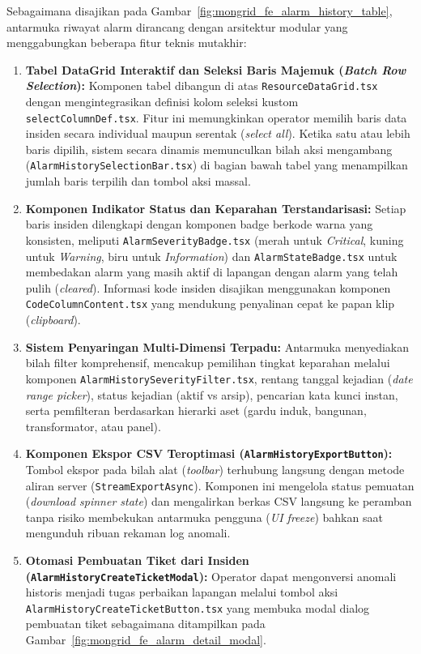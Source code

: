 Sebagaimana disajikan pada Gambar~\ref{fig:mongrid_fe_alarm_history_table}, antarmuka riwayat alarm dirancang dengan arsitektur modular yang menggabungkan beberapa fitur teknis mutakhir:
\begin{enumerate}[label=\arabic*., leftmargin=*, itemsep=0pt]
  \item \textbf{Tabel DataGrid Interaktif dan Seleksi Baris Majemuk (\textit{Batch Row Selection}):} Komponen tabel dibangun di atas \texttt{ResourceDataGrid.tsx} dengan mengintegrasikan definisi kolom seleksi kustom \texttt{selectColumnDef.tsx}. Fitur ini memungkinkan operator memilih baris data insiden secara individual maupun serentak (\textit{select all}). Ketika satu atau lebih baris dipilih, sistem secara dinamis memunculkan bilah aksi mengambang (\texttt{AlarmHistorySelectionBar.tsx}) di bagian bawah tabel yang menampilkan jumlah baris terpilih dan tombol aksi massal.
  \item \textbf{Komponen Indikator Status dan Keparahan Terstandarisasi:} Setiap baris insiden dilengkapi dengan komponen badge berkode warna yang konsisten, meliputi \texttt{AlarmSeverityBadge.tsx} (merah untuk \textit{Critical}, kuning untuk \textit{Warning}, biru untuk \textit{Information}) dan \texttt{AlarmStateBadge.tsx} untuk membedakan alarm yang masih aktif di lapangan dengan alarm yang telah pulih (\textit{cleared}). Informasi kode insiden disajikan menggunakan komponen \texttt{CodeColumnContent.tsx} yang mendukung penyalinan cepat ke papan klip (\textit{clipboard}).
  \item \textbf{Sistem Penyaringan Multi-Dimensi Terpadu:} Antarmuka menyediakan bilah filter komprehensif, mencakup pemilihan tingkat keparahan melalui komponen \texttt{AlarmHistorySeverityFilter.tsx}, rentang tanggal kejadian (\textit{date range picker}), status kejadian (aktif vs arsip), pencarian kata kunci instan, serta pemfilteran berdasarkan hierarki aset (gardu induk, bangunan, transformator, atau panel).
  \item \textbf{Komponen Ekspor CSV Teroptimasi (\texttt{AlarmHistoryExportButton}):} Tombol ekspor pada bilah alat (\textit{toolbar}) terhubung langsung dengan metode aliran server (\texttt{StreamExportAsync}). Komponen ini mengelola status pemuatan (\textit{download spinner state}) dan mengalirkan berkas CSV langsung ke peramban tanpa risiko membekukan antarmuka pengguna (\textit{UI freeze}) bahkan saat mengunduh ribuan rekaman log anomali.
  \item \textbf{Otomasi Pembuatan Tiket dari Insiden (\texttt{AlarmHistoryCreateTicketModal}):} Operator dapat mengonversi anomali historis menjadi tugas perbaikan lapangan melalui tombol aksi \texttt{AlarmHistoryCreateTicketButton.tsx} yang membuka modal dialog pembuatan tiket sebagaimana ditampilkan pada Gambar~\ref{fig:mongrid_fe_alarm_detail_modal}.
\end{enumerate}

